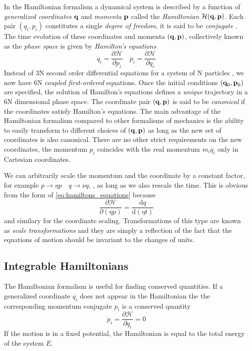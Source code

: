 In the Hamiltonian formalism a dynamical system is described by 
a function of \emph{generalized coordinates} $\boldsymbol{\mathbf{q}}$ and \emph{momenta} 
$\boldsymbol{\mathbf{p}}$ called the \emph{Hamiltonian} $\mathcal{H}(\boldsymbol{\mathbf{q}},
\boldsymbol{\mathbf{p}})$. Each pair $(q_i,p_i)$ constitutes a single 
\emph{degree of freedom}, it is said to be \emph{conjugate} . 
The time evolution of these coordinates and 
momenta
$(\boldsymbol{\mathbf{q}},\boldsymbol{\mathbf{p}})$, collectively known as the \emph{phase space} 
is given by \emph{Hamilton's equations} 
\begin{equation}
    \dot{q}_i= \frac{\partial \mathcal{H}}{\partial p_i}\quad
    \dot{p}_i= \frac{\partial \mathcal{H}}{\partial q_i} 
    \label{eq:hamiltons_equations}
\end{equation}
Instead of 3N second order differential equations for a system of N particles
, we now have 
6N \emph{coupled first-ordered} equations. Once the initial conditions
$(\boldsymbol{\mathbf{q}}_0,\boldsymbol{\mathbf{p}}_0)$ are specified, the solution of Hamilton's 
equations defines a \emph{unique} trajectory in a 
6N dimensional phase space. The coordinate pair $(\boldsymbol{\mathbf{q}},\boldsymbol{\mathbf{p}})$
is said to be \emph{canonical} if the coordinates satisfy 
Hamilton's equations. The main advantage of the Hamiltonian
formalism compared to other formalisms of mechanics is the ability
to easily transform to different choices of $(\boldsymbol{\mathbf{q}},\boldsymbol{\mathbf{p}})$
as long as the new set of coordinates is also canonical. There are no
other strict requirements on the new coordinates, the momentum 
$p_i$ coincides with the real momentum $m_i \dot{q_i}$ only in
Cartesian coordinates.

We can arbitrarily scale the momentum and the coordinate by a 
constant factor, for example $p\rightarrow\eta p\quad q\rightarrow\nu q$, 
, as long as we also
rescale the time. This is obvious from the form of 
\cref{eq:hamiltons_equations} because
\begin{equation}
    \frac{\partial \mathcal{H}}{\partial (\eta p)}= 
    \frac{\mathrm{d}q}{\mathrm{d}(\eta t)}  
    \label{eq:rescaling_hamiltonian}
\end{equation}
and similary for the coordinate scaling. Transformations of this
type are known as \emph{scale transformations} and they are simply 
a reflection of the fact that the equations of motion should be invariant
to the changes of units.
\subsection{Integrable Hamiltonians}
The Hamiltonian formalism is useful for finding conserved quantities.
If a generalized coordinate $q_i$ does not appear in the Hamiltonian
the the corresponding momentum conjugate $p_i$ is a conserved quantity
\begin{equation}
    \dot{p}_i= \frac{\partial \mathcal{H}}{\partial q_i} =0
\end{equation}
If the motion is in a fixed potential, the Hamiltonian is equal
to the total energy of the system $E$.

